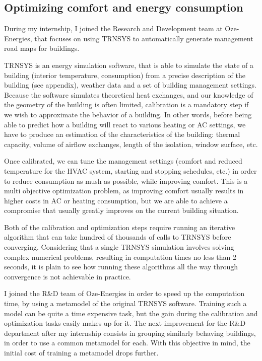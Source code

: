 \documentclass[12pt]{article}
\begin{document}
\subsection{Optimizing comfort and energy consumption}
During my internship, I joined the Research and Development team at Oze-Energies, that focuses on using TRNSYS to automatically generate management road maps for buildings.

TRNSYS is an energy simulation software, that is able to simulate the state of a building (interior temperature, consumption) from a precise description of the building (see appendix), weather data and a set of building management settings. Because the software simulates theoretical heat exchanges, and our knowledge of the geometry of the building is often limited, calibration is a mandatory step if we wish to approximate the behavior of a building. In other words, before being able to predict how a building will react to various heating or AC settings, we have to produce an estimation of the characteristics of the building: thermal capacity, volume of airflow exchanges, length of the isolation, window surface, etc.

Once calibrated, we can tune the management settings (comfort and reduced temperature for the HVAC system, starting and stopping schedules, etc.) in order to reduce consumption as mush as possible, while improving comfort. This is a multi objective optimization problem, as improving comfort usually results in higher costs in AC or heating consumption, but we are able to achieve a compromise that usually greatly improves on the current building situation.

Both of the calibration and optimization steps require running an iterative algorithm that can take hundred of thousands of calls to TRNSYS before converging. Considering that a single TRNSYS simulation involves solving complex numerical problems, resulting in computation times no less than 2 seconds, it is plain to see how running these algorithms all the way through convergence is not achievable in practice.

I joined the R\&D team of Oze-Energies in order to speed up the computation time, by using a metamodel of the original TRNSYS software. Training such a model can be quite a time expensive task, but the gain during the calibration and optimization tasks easily makes up for it. The next improvement for the R\&D department after my internship consists in grouping similarly behaving buildings, in order to use a common metamodel for each. With this objective in mind, the initial cost of training a metamodel drops further.
\end{document}
